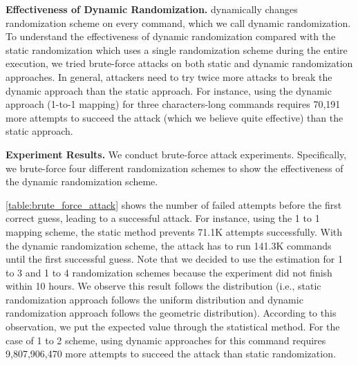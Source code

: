 \noindent
{\bf Effectiveness of Dynamic Randomization.}
\sysname dynamically changes randomization scheme on every command, which we call dynamic randomization. 
To understand the effectiveness of dynamic randomization compared with the static randomization which uses a single randomization scheme during the entire execution, we tried brute-force attacks on both static and dynamic randomization approaches. 
In general, attackers need to try twice more attacks to break the dynamic approach than the static approach. 
For instance, using the dynamic approach (1-to-1 mapping) for three characters-long commands requires 70,191 more attempts to succeed the attack (which we believe quite effective) than the static approach.


\noindent
{\bf Experiment Results.} 
We conduct brute-force attack experiments. Specifically, we brute-force four different randomization schemes to show the effectiveness of the dynamic randomization scheme. 



\autoref{table:brute_force_attack} shows the number of failed attempts before the first correct guess, leading to a successful attack. For instance, using the 1 to 1 mapping scheme, the static method prevents 71.1K attempts successfully. With the dynamic randomization scheme, the attack has to run 141.3K commands until the first successful guess.
Note that we decided to use the estimation for 1 to 3 and 1 to 4 randomization schemes because the experiment did not finish within 10 hours. We observe this result follows the distribution (i.e., static randomization approach follows the uniform distribution and dynamic randomization approach follows the geometric distribution). According to this observation, we put the expected value through the statistical method.
For the case of 1 to 2 scheme, using dynamic approaches for this command requires 9,807,906,470 more attempts to succeed the attack than static randomization.




%

